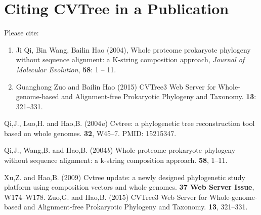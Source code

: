\documentclass[a4paper,12pt]{article}
\begin{document}
\section{Citing CVTree in a Publication}
Please cite:
\begin{enumerate}\itemsep 0pt
	\item Ji Qi, Bin Wang, Bailin Hao (2004), Whole proteome prokaryote
	   phylogeny without sequence alignment: a K-string composition approach,
	   {\it Journal of Molecular Evolution}, {\bf 58}: 1 -- 11.
	\item Guanghong Zuo and Bailin Hao (2015) CVTree3 Web Server for
	   Whole-genome-based and Alignment-free Prokaryotic Phylogeny and Taxonomy.
	    {\bf 13}: 321--331.
\end{enumerate}

\begin{thebibliography}{}
	Qi,J., Luo,H.  and Hao,B. (2004{\em{a}}) Cvtree: a phylogenetic tree
	reconstruction tool based on whole genomes.
	 {\bf 32}, W45--7.
	\newblock PMID: 15215347.

	Qi,J., Wang,B.  and Hao,B. (2004{\em{b}}) Whole proteome prokaryote phylogeny
	without sequence alignment: a k-string composition approach.
	 {\bf 58}, 1--11.

	Xu,Z. and Hao,B. (2009{\em{}}) Cvtree update: a newly designed phylogenetic
	study platform using composition vectors and whole genomes.
	 {\bf 37 Web Server Issue}, W174--W178.
	Zuo,G. and Hao,B. (2015{\em{}}) CVTree3 Web Server for Whole-genome-based and
	Alignment-free Prokaryotic Phylogeny and Taxonomy.
	 {\bf 13}, 321--331.
\end{thebibliography}
\end{document}
